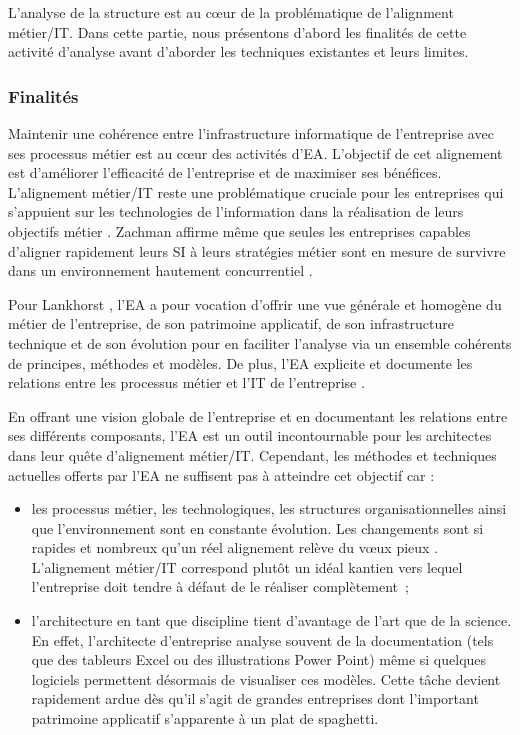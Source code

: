 L'analyse de la structure est au cœur de la problématique de l'alignment 
métier/IT. Dans cette partie, nous présentons d'abord les finalités de
cette activité d'analyse avant d'aborder les techniques existantes et
leurs limites.


\subsubsection{Finalités}

Maintenir une cohérence entre l'infrastructure informatique de l'entreprise
avec ses processus métier est au cœur des activités
d'EA\cite{lankhorst2013enterprise}. L'objectif de cet alignement est
d'améliorer l'efficacité de l'entreprise et de maximiser ses bénéfices.
L'alignement métier/IT reste une problématique cruciale pour les entreprises
qui s'appuient sur les technologies de l'information dans la réalisation de leurs
objectifs métier \cite{kaisler_enterprise_2005}. Zachman affirme même que
seules les entreprises capables d'aligner rapidement leurs SI à leurs
stratégies métier sont en mesure de survivre dans un environnement hautement
concurrentiel \cite{zachman1997enterprise}.
	
Pour Lankhorst \cite{lankhorst2013enterprise}, l'EA a pour vocation d'offrir une vue
générale et homogène du métier de l'entreprise, de son patrimoine applicatif,
de son infrastructure technique et de son évolution pour en faciliter
l'analyse via un ensemble cohérents de principes, méthodes et modèles. De plus, l'EA explicite et documente les relations entre les processus métier et
l'IT de l'entreprise \cite{kaisler_enterprise_2005}. 
	
En offrant une vision globale de l'entreprise et en documentant les
relations entre ses différents composants, l'EA est un outil incontournable
pour les architectes dans leur quête d'alignement métier/IT. Cependant, les
méthodes et techniques actuelles offerts par l'EA ne suffisent pas à atteindre
cet objectif \cite{barn2013enterprise} car :
\begin{itemize}
\item les processus métier, les technologiques, les structures organisationnelles
ainsi que l'environnement sont en constante évolution. Les changements sont si
rapides et nombreux qu'un réel alignement relève du vœux pieux
\cite{lankhorst2013enterprise}. L'alignement métier/IT correspond plutôt un
idéal kantien vers lequel l'entreprise doit tendre à défaut de le réaliser
complètement~;

\item l'architecture en tant que discipline tient d'avantage de l'art que de la science. En effet, l'architecte d'entreprise analyse souvent de la documentation (tels que des tableurs Excel ou des
illustrations Power Point) même si quelques logiciels permettent désormais de
visualiser ces modèles. Cette tâche devient rapidement ardue dès qu'il s'agit
de grandes entreprises dont l'important patrimoine applicatif s'apparente à un
plat de spaghetti.
\end{itemize}

